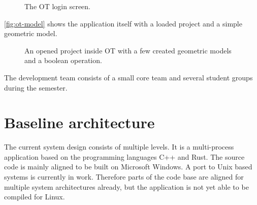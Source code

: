 \begin{figure}[ht]
	\centering
	\caption{The \ac{OT} login screen.}
	\label{fig:ot-login}
\end{figure}

\autoref{fig:ot-model} shows the application itself with a loaded project and a simple geometric model.
\begin{figure}[ht]
	\centering
	\caption{An opened project inside \ac{OT} with a few created geometric models and a boolean operation.}
	\label{fig:ot-model}
\end{figure}

The development team consists of a small core team and several student groups during the semester.


\section{Baseline architecture}
\label{chap:background.baseline_architecture}
The current system design consists of multiple levels. It is a multi-process application based on the programming languages C++ and Rust. The source code is mainly aligned to be built on Microsoft \ac{Windows}. A port to Unix based systems is currently in work. Therefore parts of the code base are aligned for multiple system architectures already, but the application is not yet able to be compiled for Linux.

